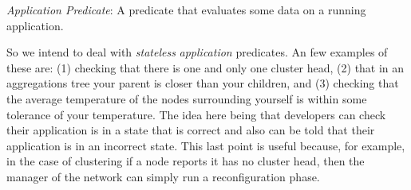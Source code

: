 \begin{mydef}
\emph{Application Predicate}: A predicate that evaluates some data on a running application.
\end{mydef}

So we intend to deal with \emph{stateless} \emph{application} predicates. An few examples of these are: (1) checking that there is one and only one cluster head, (2) that in an aggregations tree your parent is closer than your children, and (3) checking that the average temperature of the nodes surrounding yourself is within some tolerance of your temperature. The idea here being that developers can check their application is in a state that is correct and also can be told that their application is in an incorrect state. This last point is useful because, for example, in the case of clustering if a node reports it has no cluster head, then the manager of the network can simply run a reconfiguration phase.

